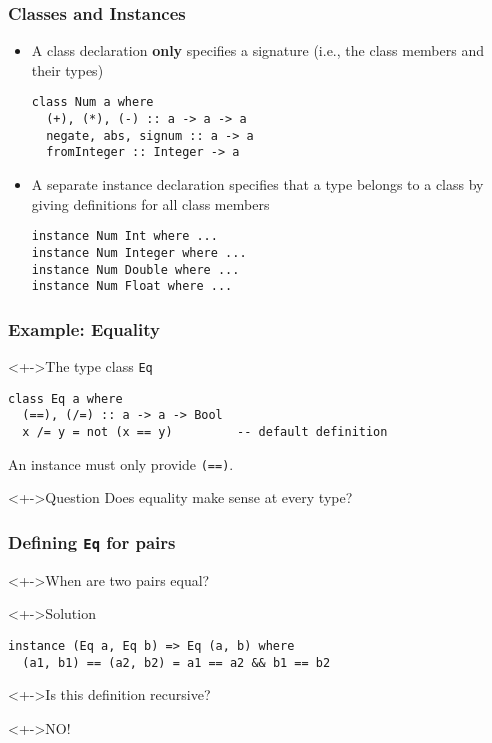 \documentclass{beamer}
\begin{document}
\begin{frame}[fragile]
  \frametitle{Classes and Instances}
  \begin{itemize}
  \item A class declaration \textbf{only} specifies a signature (i.e., the class members and their types)
\begin{lstlisting}
class Num a where
  (+), (*), (-) :: a -> a -> a
  negate, abs, signum :: a -> a
  fromInteger :: Integer -> a
\end{lstlisting}
  \item A separate instance declaration specifies that a type belongs to a class by giving definitions for all class members
\begin{lstlisting}
instance Num Int where ...
instance Num Integer where ...
instance Num Double where ...
instance Num Float where ...
\end{lstlisting}
  \end{itemize}
\end{frame}
\begin{frame}[fragile]
  \frametitle{Example: Equality}
  \begin{block}<+->{The type class \texttt{Eq}}
\begin{lstlisting}
class Eq a where
  (==), (/=) :: a -> a -> Bool
  x /= y = not (x == y)         -- default definition
\end{lstlisting}
    An instance must only provide \texttt{(==)}.
  \end{block}
  \begin{alertblock}<+->{Question}
    Does equality make sense at every type?
  \end{alertblock}
\end{frame}
\begin{frame}[fragile]
  \frametitle{Defining \texttt{Eq} for pairs}
  \begin{block}<+->{When are two pairs equal?}
  \end{block}
  \begin{block}<+->{Solution}
\begin{lstlisting}
instance (Eq a, Eq b) => Eq (a, b) where
  (a1, b1) == (a2, b2) = a1 == a2 && b1 == b2
\end{lstlisting}
  \end{block}
  \begin{block}<+->{Is this definition recursive?}
  \end{block}
  \begin{alertblock}<+->{NO!}
  \end{alertblock}
\end{frame}
\end{document}
